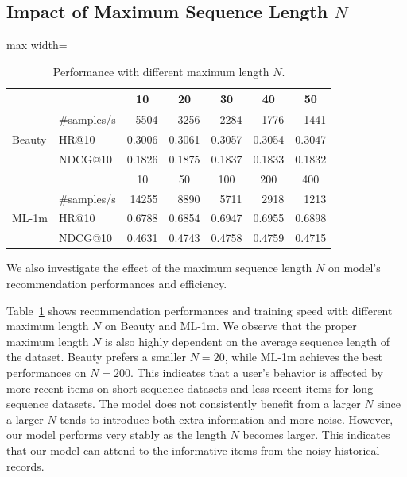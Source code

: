 \subsection{Impact of Maximum Sequence Length $N$}

\begin{table}[t]
\renewcommand{\arraystretch}{1}
    \centering
    \caption{Performance with different maximum length $N$.}
    \label{tab:seq}
    \begin{adjustbox}{max width=\linewidth}
        \begin{tabular}{l l r r r r r }
        \toprule
         & & \multicolumn{1}{c}{10} & \multicolumn{1}{c}{20} & \multicolumn{1}{c}{30} & \multicolumn{1}{c}{40}  & \multicolumn{1}{c}{50}  \\ \midrule
       \multirow{3}{*}{Beauty} & \#samples/s & 5504 & 3256 & 2284 &  1776 & 1441\\
       & HR@10 & 0.3006 & 0.3061 & 0.3057 & 0.3054 & 0.3047 \\
       & NDCG@10 & 0.1826 & 0.1875 & 0.1837 & 0.1833 & 0.1832 \\
        \bottomrule \toprule
       &  & \multicolumn{1}{c}{10} & \multicolumn{1}{c}{50} & \multicolumn{1}{c}{100} & \multicolumn{1}{c}{200}  & \multicolumn{1}{c}{400}  \\ \midrule
       \multirow{3}{*}{ML-1m} & \#samples/s & 14255 & 8890 & 5711 & 2918 & 1213\\
       & HR@10 & 0.6788 & 0.6854 & 0.6947 & 0.6955 & 0.6898 \\
       & NDCG@10 & 0.4631 & 0.4743 & 0.4758 & 0.4759 & 0.4715 \\
        \bottomrule
    \end{tabular}
    \end{adjustbox}
\end{table}




We also investigate the effect of the maximum sequence length $N$ on model's recommendation performances and efficiency.

Table~\ref{tab:seq} shows recommendation performances and training speed with different maximum length $N$ on Beauty and ML-1m.
We observe that the proper maximum length $N$ is also highly dependent on the average sequence length of the dataset.
Beauty prefers a smaller $N=20$, while ML-1m achieves the best performances on $N=200$.
This indicates that a user's behavior is affected by more recent items on short sequence datasets and less recent items for long sequence datasets.
The model does not consistently benefit from a larger $N$ since a larger $N$ tends to introduce both extra information and more noise.
However, our model performs very stably as the length $N$ becomes larger.
This indicates that our model can attend to the informative items from the noisy historical records.

